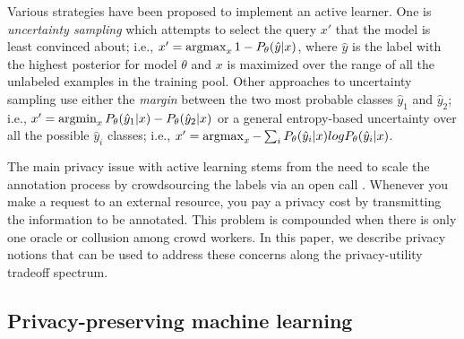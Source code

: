 \documentclass[letterpaper]{article}
\newcommand{\argmin}{\operatornamewithlimits{argmin}}
\newcommand{\argmax}{\operatornamewithlimits{argmax}}
\begin{document}
Various strategies have been proposed to implement an active learner. One is \textit{uncertainty sampling} \cite{lewis1994sequential} which attempts to select the query $x'$ that the model is least convinced about;  i.e., \begin{math} x' = \argmax_x 1 - P_\theta(\hat{y}|x) \end{math}, where \begin{math}\hat{y}\end{math} is the label with the highest posterior for model \begin{math} \theta \end{math} and $x$ is maximized over the range of all the unlabeled examples in the training pool. Other approaches to uncertainty sampling use either the \textit{margin} between the two most probable classes \begin{math}\hat{y}_1\end{math} and \begin{math}\hat{y}_2\end{math}; i.e., \begin{math} x' = \argmin_x P_\theta(\hat{y}_1|x) - P_\theta(\hat{y}_2|x)\end{math} or a general entropy-based uncertainty over all the possible \begin{math}\hat{y}_i\end{math} classes; i.e., \begin{math} x' = \argmax_x - \sum_i P_\theta(\hat{y}_i|x) log P_\theta(\hat{y}_i|x) \end{math}.

The main privacy issue with active learning stems from the need to scale the annotation process by crowdsourcing the labels via an open call \cite{howe2006rise}. Whenever you make a request to an external resource, you pay a privacy cost by transmitting the information to be annotated. This problem is compounded when there is only one oracle \cite{avidan2007efficient} or collusion among crowd workers. In this paper, we describe privacy notions that can be used to address these concerns along the privacy-utility tradeoff spectrum. 

\subsection{Privacy-preserving machine learning}

\end{document}

